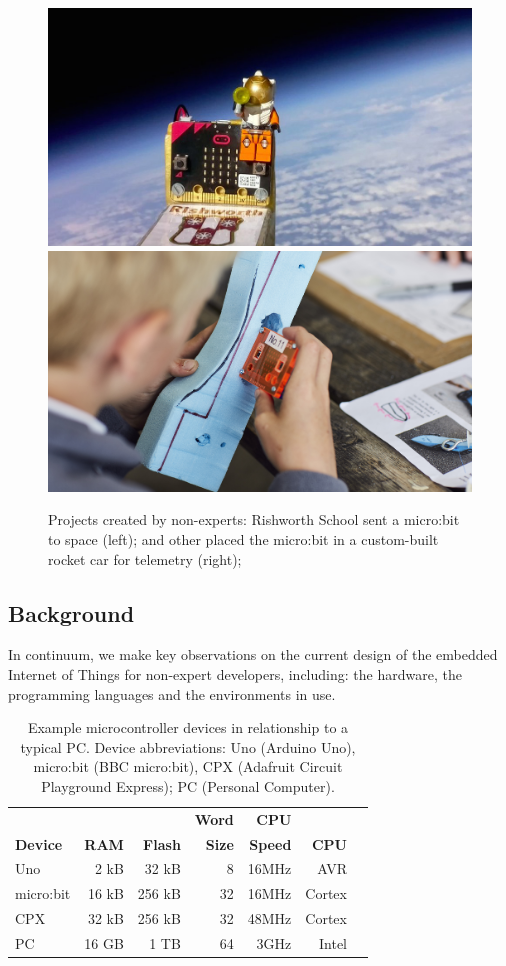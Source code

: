 \begin{figure}[t]
    \centering
    \includegraphics[width=.49\columnwidth]{images/microbit-space.jpg}
    \includegraphics[width=.49\columnwidth]{images/bloodhound.jpg}
    \caption{\label{fig:projects} Projects created by non-experts: Rishworth School sent a micro:bit to space (left); and other placed the micro:bit in a custom-built rocket car for telemetry (right); }
\end{figure}

\subsection{Background}
\label{sec:background}

In continuum, we make key observations on the current design of the embedded Internet of Things for non-expert developers, including: the hardware, the programming languages and the environments in use.



\begin{table}[]
    \centering
    \begin{tabular}{|l|r|r|r|r|r|r|}
    \hline
                           &          &              & \bf{Word}  & \bf{CPU} &            \\
    \bf{Device}            & \bf{RAM} & \bf{Flash}   & \bf{Size}  & \bf{Speed} & \bf{CPU}  \\ \hline
    Uno            & 2 kB       & 32 kB      & 8          & 16MHz & AVR       \\ \hline
    micro:bit          & 16 kB      & 256 kB     & 32         & 16MHz & Cortex     \\ \hline
    CPX           & 32 kB      & 256 kB     & 32         & 48MHz & Cortex    \\ \hline
    PC             & 16 GB      & 1 TB       & 64         & 3GHz & Intel      \\ \hline
    \end{tabular}
    \caption{\label{table:devices}Example microcontroller devices in relationship to a typical PC. Device abbreviations: Uno (Arduino Uno), micro:bit (BBC micro:bit), CPX (Adafruit Circuit Playground Express); PC (Personal Computer).}
\end{table}

